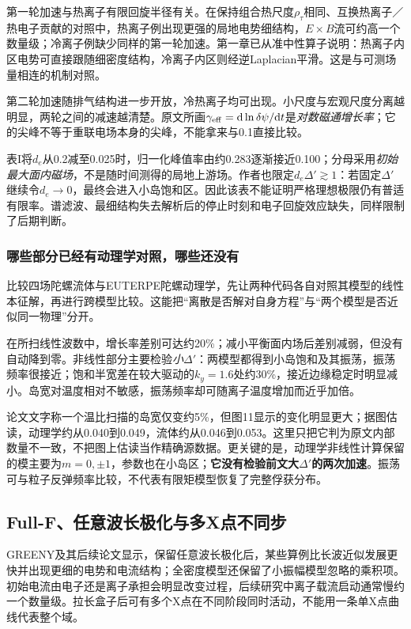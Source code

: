 第一轮加速与热离子有限回旋半径有关。在保持组合热尺度$\rho_\tau$相同、互换热离子／热电子贡献的对照中，热离子例出现更强的局地电势细结构，$E\times B$流可约高一个数量级；冷离子例缺少同样的第一轮加速。第一章已从准中性算子说明：热离子内区电势可直接跟随细密度结构，冷离子内区则经逆Laplacian平滑。这是与可测场量相连的机制对照。

第二轮加速随排气结构进一步开放，冷热离子均可出现。小尺度与宏观尺度分离越明显，两轮之间的减速越清楚。原文所画$\gamma_{\rm eff}=\mathrm d\ln\delta\psi/\mathrm d t$是\emph{对数磁通增长率}；它的尖峰不等于重联电场本身的尖峰，不能拿来与0.1直接比较。

表I将$d_e$从0.2减至0.025时，归一化峰值率由约0.283逐渐接近0.100；分母采用\emph{初始最大面内磁场}，不是随时间测得的局地上游场。作者也限定$d_e\Delta'\gtrsim1$：若固定$\Delta'$继续令$d_e\to0$，最终会进入小岛饱和区。因此该表不能证明严格理想极限仍有普适有限率。谱滤波、最细结构失去解析后的停止时刻和电子回旋效应缺失，同样限制了后期判断。

\subsubsection{哪些部分已经有动理学对照，哪些还没有}
\citet{E475}比较四场陀螺流体与EUTERPE陀螺动理学，先让两种代码各自对照其模型的线性本征解，再进行跨模型比较。这能把“离散是否解对自身方程”与“两个模型是否近似同一物理”分开。

在所扫线性波数中，增长率差别可达约20\%；减小平衡面内场后差别减弱，但没有自动降到零。非线性部分主要检验\emph{小}$\Delta'$：两模型都得到小岛饱和及其振荡，振荡频率很接近；饱和半宽差在较大驱动的$k_y=1.6$处约30\%，接近边缘稳定时明显减小。岛宽对温度相对不敏感，振荡频率却可随离子温度增加而近乎加倍。

论文文字称一个温比扫描的岛宽仅变约5\%，但图11显示的变化明显更大；据图估读，动理学约从0.040到0.049，流体约从0.046到0.053。这里只把它判为原文内部数量不一致，不把图上估读当作精确源数据。更关键的是，动理学非线性计算保留的模主要为$m=0,\pm1$，参数也在小岛区；\textbf{它没有检验前文大$\Delta'$的两次加速}。振荡可与粒子反弹频率比较，不代表有限矩模型恢复了完整俘获分布。

\subsection{Full-F、任意波长极化与多X点不同步}
GREENY及其后续论文\citep{E473,L314}显示，保留任意波长极化后，某些算例比长波近似发展更快并出现更细的电势和电流结构；全密度模型还保留了小振幅模型忽略的乘积项。初始电流由电子还是离子承担会明显改变过程，后续研究中离子载流启动通常慢约一个数量级。拉长盒子后可有多个X点在不同阶段同时活动，不能用一条单X点曲线代表整个域。

